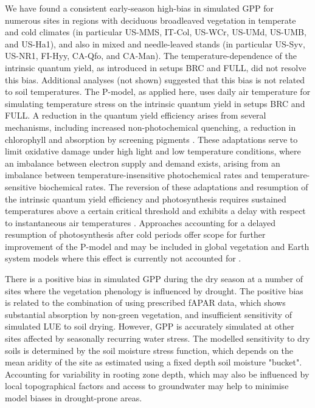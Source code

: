 \documentclass[gmd, manuscript]{copernicus}
\begin{document}
We have found a consistent early-season high-bias in simulated GPP for numerous sites in regions with deciduous broadleaved vegetation in temperate and cold climates (in particular US-MMS, IT-Col, US-WCr, US-UMd, US-UMB, and US-Ha1), and also in mixed and needle-leaved stands (in particular US-Syv, US-NR1, FI-Hyy, CA-Qfo, and CA-Man). The temperature-dependence of the intrinsic quantum yield, as introduced in setups BRC and FULL, did not resolve this bias. Additional analyses (not shown) suggested that this bias is not related to soil temperatures. The P-model, as applied here, uses daily air temperature for simulating temperature stress on the intrinsic quantum yield in setups BRC and FULL. A reduction in the quantum yield efficiency arises from several mechanisms, including increased non-photochemical quenching, a reduction in chlorophyll and absorption by screening pigments \citep{huner93, oquist03, ensminger04gcb, adams04, verhoeven14}. These adaptations serve to limit oxidative damage under high light and low temperature conditions, where an imbalance between electron supply and demand exists, arising from an imbalance between temperature-insensitive photochemical rates and temperature-sensitive biochemical rates. The reversion of these adaptations and resumption of the intrinsic quantum yield efficiency and photosynthesis requires sustained temperatures above a certain critical threshold \citep{tanja03} and exhibits a delay with respect to instantaneous air temperatures \citep{pelkonen80, makela04}. Approaches accounting for a delayed resumption of photosynthesis after cold periods offer scope for further improvement of the P-model and may be included in global vegetation and Earth system models where this effect is currently not accounted for \citep{tanja03, rogers17}.

There is a positive bias in simulated GPP during the dry season at a number of sites where the vegetation phenology is influenced by drought. The positive bias is related to the combination of using prescribed fAPAR data, which shows substantial absorption by non-green vegetation, and insufficient sensitivity of simulated LUE to soil drying. However, GPP is accurately simulated at other sites affected by seasonally recurring water stress. The modelled sensitivity to dry soils is determined by the soil moisture stress function, which depends on the mean aridity of the site as estimated using a fixed depth soil moisture "bucket". Accounting for variability in rooting zone depth, which may also be influenced by local topographical factors and access to groundwater \citep{fan13sci, fan17pnas} may help to minimise model biases in drought-prone areas.
\end{document}
